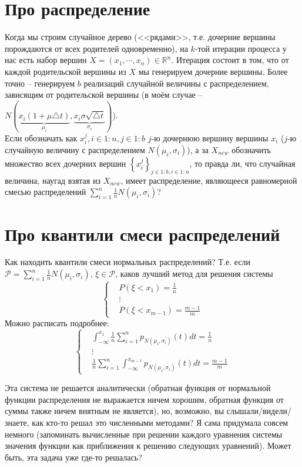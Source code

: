 \documentclass[12pt,a4paper]{article}
\begin{document}
\section{Про распределение}
Когда мы строим случайное дерево (<<рядами>>, т.е. дочерние вершины порождаются от всех родителей одновременно), на $k$-той итерации процесса у нас есть набор вершин $X = (x_1,\cdots,x_n) \in \mathbb{R}^n$. Итерация состоит в том, что от каждой родительской вершины из $X$ мы генерируем дочерние вершины. Более точно -- генерируем $b$ реализаций случайной величины с распределением, зависящим от родительской вершины (в моём случае -- $N\left( \underbrace{x_i\left(1+\mu\triangle t\right)}_{\mu_i}, \underbrace{x_i\sigma \sqrt{\triangle t}}_{\sigma_i}  \right)$). \\
Если обозначать как $x_i^j, i\in 1:n, j\in 1:b$ $j$-ю дочернюю вершину вершины $x_i$ ($j$-ю случайную величину с распределением $N\left(\mu_i, \sigma_i\right)$), а за $X_{new}$ обозначить множество всех дочерних вершин $\left\lbrace x_i^j \right\rbrace_{j\in 1:b, i\in 1:n}$, то правда ли, что случайная величина, наугад взятая из $X_{new}$, имеет распределение, являющееся равномерной смесью распределений $\sum_{i=1}^n \frac{1}{n} N\left(\mu_i, \sigma_i\right)$?
\section{Про квантили смеси распределений} %
Как находить квантили смеси нормальных распределений? Т.е. если $\mathcal{P} = \sum_{i=1}^n \frac{1}{n} N\left(\mu_i, \sigma_i\right)$, $\xi \in \mathcal{P}$, каков лучший метод для решения системы
\[
\left\lbrace \begin{matrix}
    &P(\xi < x_1) = \frac{1}{n} \\
    &\vdots\\
    &P(\xi < x_{m-1}) = \frac{m-1}{m}
\end{matrix} \right.
\]
Можно расписать подробнее:
\[
\left\lbrace \begin{matrix}
    &\int_{-\infty}^{x_1} \frac{1}{n}\sum_{i=1}^n p_{N(\mu_i,\sigma_i)} (t) dt = \frac{1}{n} \\
    &\vdots\\
    &\frac{1}{n}\sum_{i=1}^n \int_{-\infty}^{x_{m-1}} p_{N(\mu_i,\sigma_i)} (t) dt = \frac{m-1}{m}
\end{matrix} \right.
\]

Эта система не решается аналитически (обратная функция от нормальной функции распределения не выражается ничем хорошим, обратная функция от суммы также ничем внятным не является), но, возможно, вы слышали/видели/знаете, как кто-то решал это численными методами? Я сама придумала совсем немного (запоминать вычисленные при решении каждого уравнения системы значения функции как приближения к решению следующих уравнений). Может быть, эта задача уже где-то решалась? \\
\end{document}
